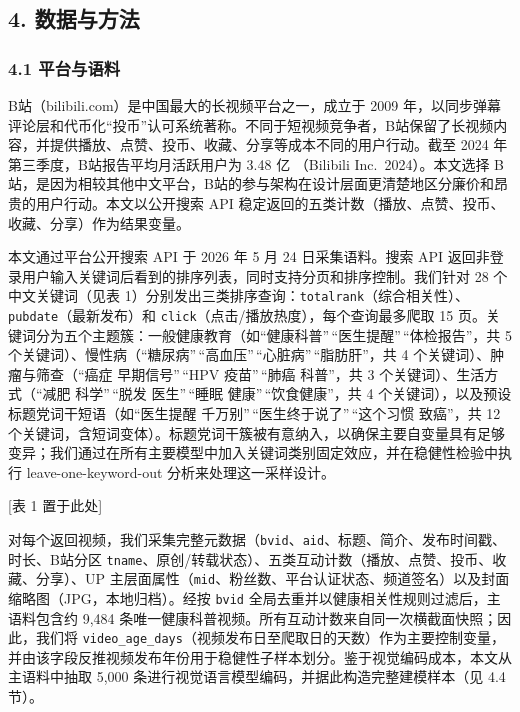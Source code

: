 \documentclass[
  fontset=none]{ctexart}
\begin{document}
\subsection{4. 数据与方法}\label{ux6570ux636eux4e0eux65b9ux6cd5}

\subsubsection{4.1 平台与语料}\label{ux5e73ux53f0ux4e0eux8bedux6599}

B站（bilibili.com）是中国最大的长视频平台之一，成立于 2009 年，以同步弹幕评论层和代币化``投币''认可系统著称。不同于短视频竞争者，B站保留了长视频内容，并提供播放、点赞、投币、收藏、分享等成本不同的用户行动。截至 2024 年第三季度，B站报告平均月活跃用户为 3.48 亿 （Bilibili Inc.~2024）。本文选择 B站，是因为相较其他中文平台，B站的参与架构在设计层面更清楚地区分廉价和昂贵的用户行动。本文以公开搜索 API 稳定返回的五类计数（播放、点赞、投币、收藏、分享）作为结果变量。

本文通过平台公开搜索 API 于 2026 年 5 月 24 日采集语料。搜索 API 返回非登录用户输入关键词后看到的排序列表，同时支持分页和排序控制。我们针对 28 个中文关键词（见表 1）分别发出三类排序查询：\texttt{totalrank}（综合相关性）、\texttt{pubdate}（最新发布）和 \texttt{click}（点击/播放热度），每个查询最多爬取 15 页。关键词分为五个主题簇：一般健康教育（如``健康科普''\,``医生提醒''\,``体检报告''，共 5 个关键词）、慢性病（``糖尿病''\,``高血压''\,``心脏病''\,``脂肪肝''，共 4 个关键词）、肿瘤与筛查（``癌症 早期信号''\,``HPV 疫苗''\,``肺癌 科普''，共 3 个关键词）、生活方式（``减肥 科学''\,``脱发 医生''\,``睡眠 健康''\,``饮食健康''，共 4 个关键词），以及预设标题党词干短语（如``医生提醒 千万别''\,``医生终于说了''\,``这个习惯 致癌''，共 12 个关键词，含短词变体）。标题党词干簇被有意纳入，以确保主要自变量具有足够变异；我们通过在所有主要模型中加入关键词类别固定效应，并在稳健性检验中执行 leave-one-keyword-out 分析来处理这一采样设计。

{[}表 1 置于此处{]}

对每个返回视频，我们采集完整元数据（\texttt{bvid}、\texttt{aid}、标题、简介、发布时间戳、时长、B站分区 \texttt{tname}、原创/转载状态）、五类互动计数（播放、点赞、投币、收藏、分享）、UP 主层面属性（\texttt{mid}、粉丝数、平台认证状态、频道签名）以及封面缩略图（JPG，本地归档）。经按 \texttt{bvid} 全局去重并以健康相关性规则过滤后，主语料包含约 9{,}484 条唯一健康科普视频。所有互动计数来自同一次横截面快照；因此，我们将 \texttt{video\_age\_days}（视频发布日至爬取日的天数）作为主要控制变量，并由该字段反推视频发布年份用于稳健性子样本划分。鉴于视觉编码成本，本文从主语料中抽取 5{,}000 条进行视觉语言模型编码，并据此构造完整建模样本（见 4.4 节）。
\end{document}
